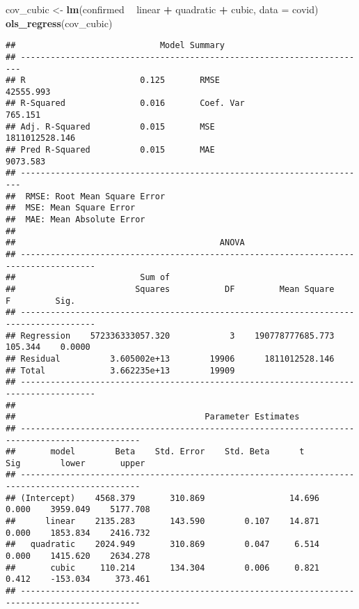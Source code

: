 \documentclass[]{article}
\newenvironment{Shaded}{\begin{snugshade}}{\end{snugshade}}
\newcommand{\KeywordTok}[1]{\textcolor[rgb]{0.13,0.29,0.53}{\textbf{#1}}}
\newcommand{\DataTypeTok}[1]{\textcolor[rgb]{0.13,0.29,0.53}{#1}}
\newcommand{\StringTok}[1]{\textcolor[rgb]{0.31,0.60,0.02}{#1}}
\newcommand{\OperatorTok}[1]{\textcolor[rgb]{0.81,0.36,0.00}{\textbf{#1}}}
\newcommand{\NormalTok}[1]{#1}
\begin{document}
\begin{Shaded}
\begin{Highlighting}[]
\NormalTok{cov_cubic <-}\StringTok{ }\KeywordTok{lm}\NormalTok{(confirmed }\OperatorTok{~}\StringTok{ }\NormalTok{linear }\OperatorTok{+}\StringTok{ }\NormalTok{quadratic }\OperatorTok{+}\StringTok{ }\NormalTok{cubic, }\DataTypeTok{data =}\NormalTok{ covid)}
\KeywordTok{ols_regress}\NormalTok{(cov_cubic)}
\end{Highlighting}
\end{Shaded}

\begin{verbatim}
##                             Model Summary                              
## ----------------------------------------------------------------------
## R                       0.125       RMSE                    42555.993 
## R-Squared               0.016       Coef. Var                 765.151 
## Adj. R-Squared          0.015       MSE                1811012528.146 
## Pred R-Squared          0.015       MAE                      9073.583 
## ----------------------------------------------------------------------
##  RMSE: Root Mean Square Error 
##  MSE: Mean Square Error 
##  MAE: Mean Absolute Error 
## 
##                                         ANOVA                                         
## -------------------------------------------------------------------------------------
##                         Sum of                                                       
##                        Squares           DF         Mean Square       F         Sig. 
## -------------------------------------------------------------------------------------
## Regression    572336333057.320            3    190778777685.773    105.344    0.0000 
## Residual          3.605002e+13        19906      1811012528.146                      
## Total             3.662235e+13        19909                                          
## -------------------------------------------------------------------------------------
## 
##                                      Parameter Estimates                                       
## ----------------------------------------------------------------------------------------------
##       model        Beta    Std. Error    Std. Beta      t        Sig        lower       upper 
## ----------------------------------------------------------------------------------------------
## (Intercept)    4568.379       310.869                 14.696    0.000    3959.049    5177.708 
##      linear    2135.283       143.590        0.107    14.871    0.000    1853.834    2416.732 
##   quadratic    2024.949       310.869        0.047     6.514    0.000    1415.620    2634.278 
##       cubic     110.214       134.304        0.006     0.821    0.412    -153.034     373.461 
## ----------------------------------------------------------------------------------------------
\end{verbatim}
\end{document}
